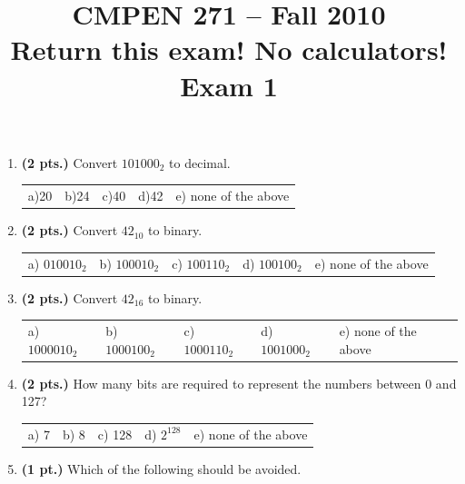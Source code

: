 \documentclass{article}
\begin{document}
\newcommand{\SOPmin}{${\rm SOP}_{\rm min} \ $}
\newcommand{\POSmin}{${\rm POS}_{\rm min} \ $}
\newcommand{\bs}{\backslash}


\title{
\Huge{CMPEN 271 -- Fall 2010}\\
\normalsize{Return this exam!  No calculators!}\\
\normalsize{Exam 1}\\
 }
\date{}

\maketitle{}


\begin{enumerate}

\item {\bf (2 pts.)} Convert $101000_2$ to decimal.

\begin{tabular}{p{0.7in} p{0.7in} p{0.7in} p{0.7in} l}
a)20 & b)24  & c)40  & d)42  & e) none of the above
\end{tabular}

\item {\bf (2 pts.)} Convert $42_{10}$ to binary.

\begin{tabular}{p{0.7in} p{0.7in} p{0.7in} p{0.7in} l}
a) $010010_2$ & b) $100010_2$ & c) $100110_2$ & d) $100100_2$ & e) none of the above
\end{tabular}

\item {\bf (2 pts.)} Convert $42_{16}$ to binary.

\begin{tabular}{p{0.7in} p{0.7in} p{0.7in} p{0.7in} l}
a) $1000010_2$ & b) $1000100_2$ & c) $1000110_2$ & d) $1001000_2$ & e) none of the above
\end{tabular}

\item {\bf (2 pts.)} How many bits are required to represent the numbers
between 0 and 127?

\begin{tabular}{p{0.7in} p{0.7in} p{0.7in} p{0.7in} l}
a) 7 & b) 8 & c) 128 & d) $2^{128}$ & e) none of the above
\end{tabular}

\item {\bf (1 pt.)} Which of the following should be avoided.


\end{enumerate}
\end{document}
